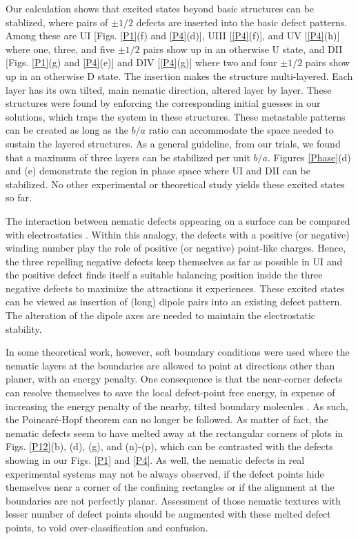 \documentclass[prl,twocolumn,preprintnumbers,reprint]{revtex4}
\begin{document}
Our calculation shows that excited states beyond basic structures can be stablized, where pairs of $\pm 1/2$ defects are inserted into the basic defect patterns.
Among these are UI [Figs. \ref{P1}(f) and \ref{P4}(d)], UIII [\ref{P4}(f)], and UV [\ref{P4}(h)] where one, three, and five $\pm 1/2$ pairs show up in an otherwise U state, and DII [Figs. \ref{P1}(g) and \ref{P4}(e)] and
DIV [\ref{P4}(g)]  where two and four $\pm 1/2$ pairs show up in an otherwise D state. The insertion makes the structure
multi-layered.
Each layer has its own tilted, main nematic direction, altered layer by layer. These structures were found by enforcing the corresponding initial guesses in our solutions, which traps the system in these structures.
These metastable patterns can be created as long as the $b/a$ ratio can accommodate the space needed to sustain the layered structures.
As a general guideline, from our trials, we found that a maximum of three layers can be stabilized per unit $b/a$. Figures \ref{Phase}(d) and (e) demonstrate the region in phase space where UI and DII can be stabilized. No other experimental or theoretical study yields these excited states so far.

The interaction between nematic defects appearing on a surface can be compared with electrostatics {\cite{Lubensky1992,chaikin1995principles}}. Within this analogy, the defects with a positive (or negative) winding number play the role of positive (or negative) point-like
charges. Hence, the three repelling negative defects keep themselves as far as possible in UI and the positive defect finds itself a suitable balancing position inside the three negative defects to maximize the attractions it experiences.
These excited states can be viewed as insertion of (long) dipole pairs into an existing defect pattern. The alteration of the dipole axes are needed to maintain the electrostatic stability.

In some theoretical work, however, soft boundary conditions were used where the nematic layers at the boundaries are allowed to point at directions other than planer, with an energy penalty. One consequence is that the near-corner defects can resolve themselves to save the local defect-point free energy, in expense of increasing the energy penalty of the nearby, tilted boundary molecules \cite{Tsakonas2007,Luo2012,Lewis2014}. As such, the Poincar{\' e}-Hopf theorem can no longer be followed. As matter of fact, the nematic defects seem to have melted away at the rectangular corners of plots in Figs. \ref{P12}(b), (d), (g), and (n)-(p), which can be contrasted with the defects showing in our Figs. \ref{P1} and \ref{P4}. As well, the nematic defects in real experimental systems may not be always observed, if the defect points hide themselves near a corner of the confining rectangles or if the alignment at the boundaries are not perfectly planar. Assessment of those nematic textures with lesser number of defect points should be augmented with these melted defect points, to void over-classification and confusion.
\end{document}
